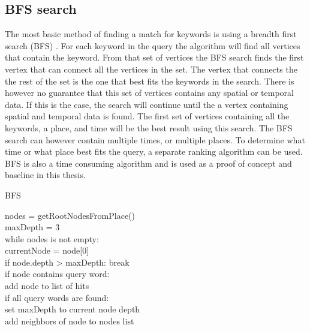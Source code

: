 \subsection{BFS search}
The most basic method of finding a match for keywords is using a breadth first search (BFS) \cite{He:2007:BRK:1247480.1247516}. For each keyword in the query the algorithm will find all vertices that contain the keyword. From that set of vertices the BFS search finds the first vertex that can connect all the vertices in the set. The vertex that connects the the rest of the set is the one that best fits the keywords in the search. There is however no guarantee that this set of vertices contains any spatial or temporal data. If this is the case, the search will continue until the a vertex containing spatial and temporal data is found. The first set of vertices containing all the keywords, a place, and time will be the best result using this search. The BFS search can however contain multiple times, or multiple places. To determine what time or what place best fits the query, a separate ranking algorithm can be used. BFS is also a time consuming algorithm and is used as a proof of concept and baseline in this thesis.\\

\begin{algorithm}
\caption{BFS}
\begin{algorithmic}[1]
nodes = getRootNodesFromPlace()\\
maxDepth = 3\\

while nodes is not empty:\\
	currentNode = node[0]\\
	if node.depth > maxDepth: break\\
	if node contains query word:\\
		add node to list of hits\\
	if all query words are found:\\
		set maxDepth to current node depth\\
	add neighbors of node to nodes list\\
\EndProcedure
\end{algorithmic}
\end{algorithm}

